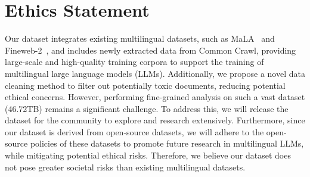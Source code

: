 \section*{Ethics Statement}
Our dataset integrates existing multilingual datasets, such as MaLA~\cite{ji2024emma} and Fineweb-2~\cite{penedo2024fineweb-2}, and includes newly extracted data from Common Crawl, providing large-scale and high-quality training corpora to support the training of multilingual large language models (LLMs).
Additionally, we propose a novel data cleaning method to filter out potentially toxic documents, reducing potential ethical concerns. 
However, performing fine-grained analysis on such a vast dataset (46.72TB) remains a significant challenge.
To address this, we will release the dataset for the community to explore and research extensively.
Furthermore, since our dataset is derived from open-source datasets, we will adhere to the open-source policies of these datasets to promote future research in multilingual LLMs, while mitigating potential ethical risks.
Therefore, we believe our dataset does not pose greater societal risks than existing multilingual datasets. 